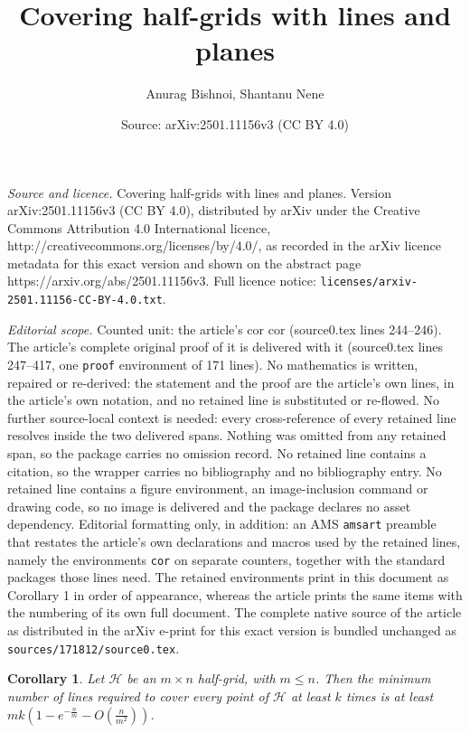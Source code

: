 \documentclass[10pt,a4paper]{amsart}
\title{Covering half-grids with lines and planes}
\author{Anurag Bishnoi, Shantanu Nene}
\date{Source: arXiv:2501.11156v3 (CC BY 4.0)}
\newtheorem{cor}{Corollary}
\def\cH{{\mathcal H}}
\begin{document}
\maketitle

\noindent\emph{Source and licence.} Covering half-grids with lines and planes. Version arXiv:2501.11156v3 (CC BY 4.0), distributed by arXiv under the Creative Commons Attribution 4.0 International licence, http://creativecommons.org/licenses/by/4.0/, as recorded in the arXiv licence metadata for this exact version and shown on the abstract page https://arxiv.org/abs/2501.11156v3. Full licence notice: \texttt{licenses/arxiv-2501.11156-CC-BY-4.0.txt}.\par\smallskip

\noindent\textit{Editorial scope.} Counted unit: the article's cor cor (source0.tex lines 244--246). The article's complete original proof of it is delivered with it (source0.tex lines 247--417, one \texttt{proof} environment of 171 lines). No mathematics is written, repaired or re-derived: the statement and the proof are the article's own lines, in the article's own notation, and no retained line is substituted or re-flowed.  No further source-local context is needed: every cross-reference of every retained line resolves inside the two delivered spans.  Nothing was omitted from any retained span, so the package carries no omission record.  No retained line contains a citation, so the wrapper carries no bibliography and no bibliography entry.  No retained line contains a figure environment, an image-inclusion command or drawing code, so no image is delivered and the package declares no asset dependency.  Editorial formatting only, in addition: an AMS \texttt{amsart} preamble that restates the article's own declarations and macros used by the retained lines, namely the environments \texttt{cor} on separate counters, together with the standard packages those lines need.  The retained environments print in this document as Corollary 1 in order of appearance, whereas the article prints the same items with the numbering of its own full document.  The complete native source of the article as distributed in the arXiv e-print for this exact version is bundled unchanged as \texttt{sources/171812/source0.tex}.
\begin{cor}
    Let $\cH$ be an $m \times n$ half-grid, with $m \leq n$. Then the minimum number of lines required to cover every point of $\cH$ at least $k$ times is at least $mk\left(1-e^{-\frac{n}{m}}-O(\frac{n}{m^2})\right)$.
\end{cor}
\end{document}
